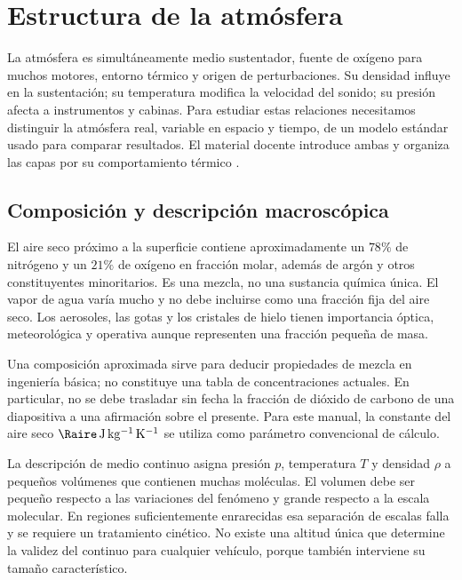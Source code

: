 \chapter{Estructura de la atmósfera}\label{ch:03}

La atmósfera es simultáneamente medio sustentador, fuente de oxígeno para muchos motores, entorno térmico y origen de perturbaciones. Su densidad influye en la sustentación; su temperatura modifica la velocidad del sonido; su presión afecta a instrumentos y cabinas. Para estudiar estas relaciones necesitamos distinguir la atmósfera real, variable en espacio y tiempo, de un modelo estándar usado para comparar resultados. El material docente introduce ambas y organiza las capas por su comportamiento térmico \cite{TAE2}.

\section{Composición y descripción macroscópica}
El aire seco próximo a la superficie contiene aproximadamente un $78\%$ de nitrógeno y un $21\%$ de oxígeno en fracción molar, además de argón y otros constituyentes minoritarios. Es una mezcla, no una sustancia química única. El vapor de agua varía mucho y no debe incluirse como una fracción fija del aire seco. Los aerosoles, las gotas y los cristales de hielo tienen importancia óptica, meteorológica y operativa aunque representen una fracción pequeña de masa.

Una composición aproximada sirve para deducir propiedades de mezcla en ingeniería básica; no constituye una tabla de concentraciones actuales. En particular, no se debe trasladar sin fecha la fracción de dióxido de carbono de una diapositiva a una afirmación sobre el presente. Para este manual, la constante del aire seco $\Raire\,\mathrm{J\,kg^{-1}\,K^{-1}}$ se utiliza como parámetro convencional de cálculo.

La descripción de medio continuo asigna presión $p$, temperatura $T$ y densidad $\rho$ a pequeños volúmenes que contienen muchas moléculas. El volumen debe ser pequeño respecto a las variaciones del fenómeno y grande respecto a la escala molecular. En regiones suficientemente enrarecidas esa separación de escalas falla y se requiere un tratamiento cinético. No existe una altitud única que determine la validez del continuo para cualquier vehículo, porque también interviene su tamaño característico.

